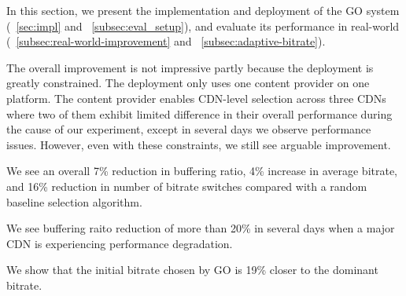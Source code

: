 \label{sec:eval}

In this section, we present the implementation and deployment of the GO system (\Section~\ref{sec:impl} and ~\ref{subsec:eval_setup}), and evaluate its performance in real-world (\Section~\ref{subsec:real-world-improvement} and ~\ref{subsec:adaptive-bitrate}). 

The overall improvement is not impressive partly because the deployment is greatly constrained. The deployment only uses one content provider on one platform. 
The content provider enables CDN-level selection across three CDNs where two of them exhibit limited difference in their overall performance during the cause of our experiment,
except in several days we observe performance issues.
However, even with these constraints, we still see arguable improvement. 

\begin{packedenumerate}
    \item We see an overall 7\% reduction in buffering ratio, 4\% increase in average bitrate, and 16\% reduction in number of bitrate switches compared with a random baseline selection algorithm.
    \item We see buffering raito reduction of more than 20\% in several days when a major CDN is experiencing performance degradation.
    \item We show that the initial bitrate chosen by GO is 19\% closer to the dominant bitrate.
\end{packedenumerate}




